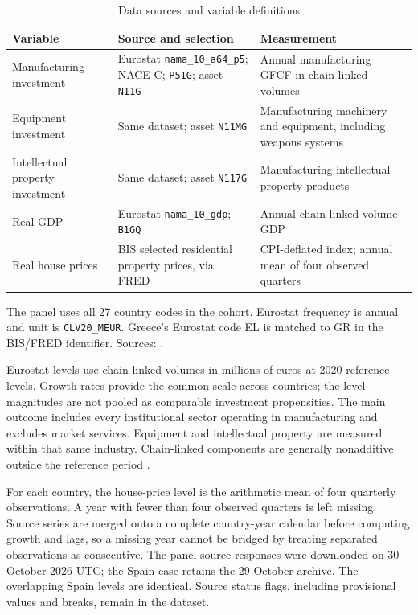\documentclass[11pt,letterpaper]{article}
\begin{document}
\begin{table}[!htbp]\centering
\begin{threeparttable}
\caption{Data sources and variable definitions}\label{tab:1}
\small{}\setlength{\tabcolsep}{4pt}\renewcommand{\arraystretch}{1.22}
\begin{tabularx}{\linewidth}{@{}Y Y Y@{}}
\toprule
\textbf{Variable} & \textbf{Source and selection} & \textbf{Measurement}\\
\midrule
Manufacturing investment & Eurostat \texttt{nama\_10\_a64\_p5}; NACE C; \texttt{P51G}; asset \texttt{N11G} & Annual manufacturing GFCF in chain-linked volumes\\
Equipment investment & Same dataset; asset \texttt{N11MG} & Manufacturing machinery and equipment, including weapons systems\\
Intellectual property investment & Same dataset; asset \texttt{N117G} & Manufacturing intellectual property products\\
Real GDP & Eurostat \texttt{nama\_10\_gdp}; \texttt{B1GQ} & Annual chain-linked volume GDP\\
Real house prices & BIS selected residential property prices, via FRED & CPI-deflated index; annual mean of four observed quarters\\
\bottomrule\end{tabularx}
\begin{tablenotes}[flushleft]\footnotesize{}
\item The panel uses all 27 country codes in the cohort. Eurostat frequency is annual and unit is \texttt{CLV20\_MEUR}. Greece's Eurostat code EL is matched to GR in the BIS/FRED identifier. Sources: \citet{eurostatinv,eurostatgdp,bispanel2026}.
\end{tablenotes}\end{threeparttable}\end{table}\FloatBarrier

Eurostat levels use chain-linked volumes in millions of euros at 2020 reference levels. Growth rates provide the common scale across countries; the level magnitudes are not pooled as comparable investment propensities. The main outcome includes every institutional sector operating in manufacturing and excludes market services. Equipment and intellectual property are measured within that same industry. Chain-linked components are generally nonadditive outside the reference period \citep{eurostatmeta}.

For each country, the house-price level is the arithmetic mean of four quarterly observations. A year with fewer than four observed quarters is left missing. Source series are merged onto a complete country-year calendar before computing growth and lags, so a missing year cannot be bridged by treating separated observations as consecutive. The panel source responses were downloaded on 30 October 2026 UTC; the Spain case retains the 29 October archive. The overlapping Spain levels are identical. Source status flags, including provisional values and breaks, remain in the dataset.
\end{document}
